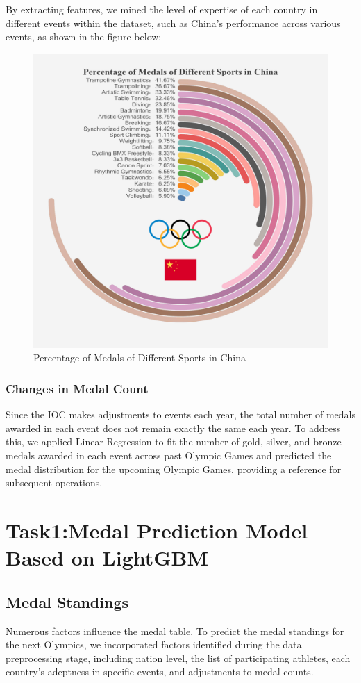 \documentclass[12pt]{article}  %
\begin{document}
By extracting features, we mined the level of expertise of each country in different events within the dataset, such as China's performance across various events, as shown in the figure below:

\begin{figure}[htbp]
	\centering
	\includegraphics[width=12cm]{img/Percentage.jpg}
	\caption{Percentage of Medals of Different Sports in China}
	\label{fig:aa}
\end{figure}


\subsubsection{Changes in Medal Count}
Since the IOC makes adjustments to events each year, the total number of medals awarded in each event does not remain exactly the same each year. To address this, we applied \textbf Linear Regression to fit the number of gold, silver, and bronze medals awarded in each event across past Olympic Games and predicted the medal distribution for the upcoming Olympic Games, providing a reference for subsequent operations.

\section{Task1:Medal Prediction Model Based on LightGBM}
\subsection{Medal Standings}
Numerous factors influence the medal table. To predict the medal standings for the next Olympics, we incorporated factors identified during the data preprocessing stage, including nation level, the list of participating athletes, each country's adeptness in specific events, and adjustments to medal counts.
\end{document}
